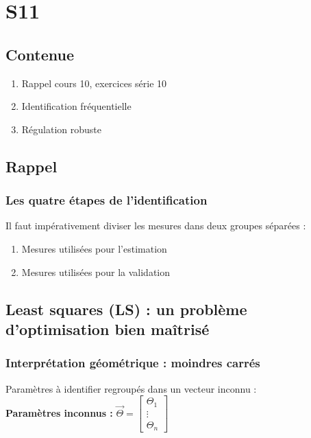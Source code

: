 \documentclass[document.tex]{subfiles}
\begin{document}
\newpage
\section{S11}

\subsection{Contenue}
\begin{enumerate}
\item Rappel cours 10, exercices série 10
\item Identification fréquentielle
\item Régulation robuste
\end{enumerate}

\subsection{Rappel}

\subsubsection{Les quatre étapes de l'identification}

Il faut impérativement diviser les mesures dans deux groupes séparées :\\

\begin{enumerate}
\item Mesures utilisées pour l'estimation
\item Mesures utilisées pour la validation
\end{enumerate}


\subsection{Least squares (LS) : un problème d'optimisation bien maîtrisé}



\subsubsection{Interprétation géométrique : moindres carrés}

Paramètres à identifier regroupés dans un vecteur inconnu :\\
\textbf{Paramètres inconnus :} $\vec{\Theta}= \begin{bmatrix} \Theta_1 \\ \vdots \\ \Theta_n \end{bmatrix} $\\
\end{document}
